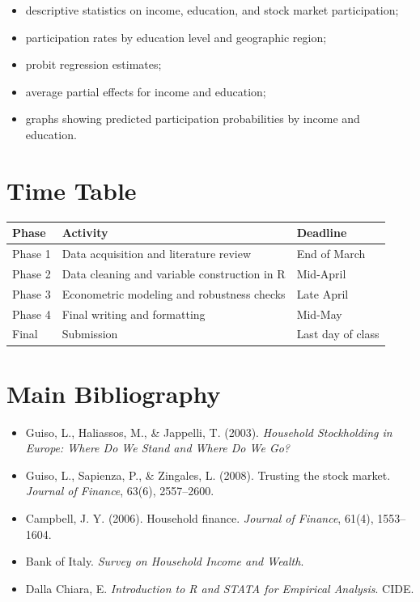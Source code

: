 \documentclass[12pt]{article}
\begin{document}
\begin{itemize}[leftmargin=*]
    \item descriptive statistics on income, education, and stock market participation;
    \item participation rates by education level and geographic region;
    \item probit regression estimates;
    \item average partial effects for income and education;
    \item graphs showing predicted participation probabilities by income and education.
\end{itemize}

\section{Time Table}

\begin{center}
\begin{tabular}{lll}
\toprule
\textbf{Phase} & \textbf{Activity} & \textbf{Deadline} \\
\midrule
Phase 1 & Data acquisition and literature review & End of March \\
Phase 2 & Data cleaning and variable construction in R & Mid-April \\
Phase 3 & Econometric modeling and robustness checks & Late April \\
Phase 4 & Final writing and formatting & Mid-May \\
Final & Submission & Last day of class \\
\bottomrule
\end{tabular}
\end{center}

\section{Main Bibliography}

\begin{itemize}[leftmargin=*]
    \item Guiso, L., Haliassos, M., \& Jappelli, T. (2003). \textit{Household Stockholding in Europe: Where Do We Stand and Where Do We Go?}
    \item Guiso, L., Sapienza, P., \& Zingales, L. (2008). Trusting the stock market. \textit{Journal of Finance}, 63(6), 2557--2600.
    \item Campbell, J. Y. (2006). Household finance. \textit{Journal of Finance}, 61(4), 1553--1604.
    \item Bank of Italy. \textit{Survey on Household Income and Wealth}.
    \item Dalla Chiara, E. \textit{Introduction to R and STATA for Empirical Analysis}. CIDE.
\end{itemize}
\end{document}
